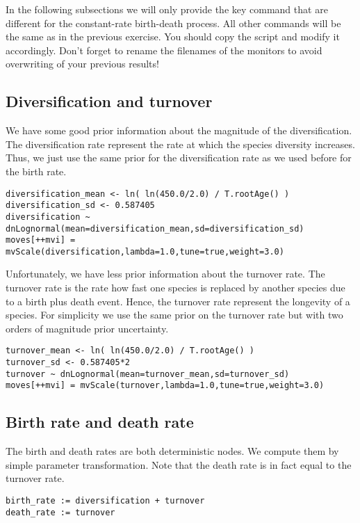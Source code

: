 In the following subsections we will only provide the key command that are different for the constant-rate birth-death process.
All other commands will be the same as in the previous exercise.
You should copy the  script and modify it accordingly.
Don't forget to rename the filenames of the monitors to avoid overwriting of your previous results!


\subsection{Diversification and turnover}

We have some good prior information about the magnitude of the diversification.
The diversification rate represent the rate at which the species diversity increases.
Thus, we just use the same prior for the diversification rate as we used before for the birth rate.
{\tt \begin{snugshade*}
\begin{lstlisting}
diversification_mean <- ln( ln(450.0/2.0) / T.rootAge() )
diversification_sd <- 0.587405
diversification ~ dnLognormal(mean=diversification_mean,sd=diversification_sd) 
moves[++mvi] = mvScale(diversification,lambda=1.0,tune=true,weight=3.0)
\end{lstlisting}
\end{snugshade*}}

Unfortunately, we have less prior information about the turnover rate.
The turnover rate is the rate how fast one species is replaced by another species due to a birth plus death event.
Hence, the turnover rate represent the longevity of a species.
For simplicity we use the same prior on the turnover rate but with two orders of magnitude prior uncertainty.
{\tt \begin{snugshade*}
\begin{lstlisting}
turnover_mean <- ln( ln(450.0/2.0) / T.rootAge() )
turnover_sd <- 0.587405*2
turnover ~ dnLognormal(mean=turnover_mean,sd=turnover_sd) 
moves[++mvi] = mvScale(turnover,lambda=1.0,tune=true,weight=3.0)
\end{lstlisting}
\end{snugshade*}}

\subsection{Birth rate and death rate}

The birth and death rates are both deterministic nodes. 
We compute them by simple parameter transformation.
Note that the death rate is in fact equal to the turnover rate.
{\tt \begin{snugshade*}
\begin{lstlisting}
birth_rate := diversification + turnover
death_rate := turnover
\end{lstlisting}
\end{snugshade*}}

